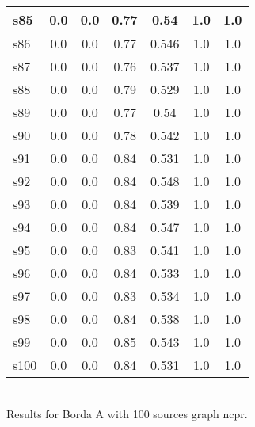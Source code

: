 \documentclass{article}
\begin{document}
\begin{tabular}{|l|c|c|c|c|c|c|}
\hline
s85 &0.0 & 0.0 & 0.77 & 0.54 & 1.0 & 1.0\\
\hline
s86 &0.0 & 0.0 & 0.77 & 0.546 & 1.0 & 1.0\\
\hline
s87 &0.0 & 0.0 & 0.76 & 0.537 & 1.0 & 1.0\\
\hline
s88 &0.0 & 0.0 & 0.79 & 0.529 & 1.0 & 1.0\\
\hline
s89 &0.0 & 0.0 & 0.77 & 0.54 & 1.0 & 1.0\\
\hline
s90 &0.0 & 0.0 & 0.78 & 0.542 & 1.0 & 1.0\\
\hline
s91 &0.0 & 0.0 & 0.84 & 0.531 & 1.0 & 1.0\\
\hline
s92 &0.0 & 0.0 & 0.84 & 0.548 & 1.0 & 1.0\\
\hline
s93 &0.0 & 0.0 & 0.84 & 0.539 & 1.0 & 1.0\\
\hline
s94 &0.0 & 0.0 & 0.84 & 0.547 & 1.0 & 1.0\\
\hline
s95 &0.0 & 0.0 & 0.83 & 0.541 & 1.0 & 1.0\\
\hline
s96 &0.0 & 0.0 & 0.84 & 0.533 & 1.0 & 1.0\\
\hline
s97 &0.0 & 0.0 & 0.83 & 0.534 & 1.0 & 1.0\\
\hline
s98 &0.0 & 0.0 & 0.84 & 0.538 & 1.0 & 1.0\\
\hline
s99 &0.0 & 0.0 & 0.85 & 0.543 & 1.0 & 1.0\\
\hline
s100 &0.0 & 0.0 & 0.84 & 0.531 & 1.0 & 1.0\\
\hline
\end{tabular}\\

\noindent Results for Borda A with 100 sources graph ncpr.
\end{document}
